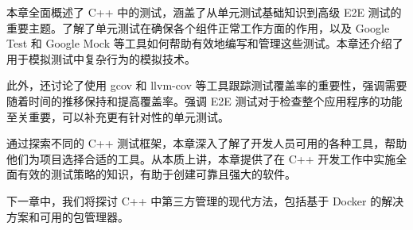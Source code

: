 
本章全面概述了 C++ 中的测试，涵盖了从单元测试基础知识到高级 E2E 测试的重要主题。了解了单元测试在确保各个组件正常工作方面的作用，以及 Google Test 和 Google Mock 等工具如何帮助有效地编写和管理这些测试。本章还介绍了用于模拟测试中复杂行为的模拟技术。

此外，还讨论了使用 gcov 和 llvm-cov 等工具跟踪测试覆盖率的重要性，强调需要随着时间的推移保持和提高覆盖率。强调 E2E 测试对于检查整个应用程序的功能至关重要，可以补充更有针对性的单元测试。

通过探索不同的 C++ 测试框架，本章深入了解了开发人员可用的各种工具，帮助他们为项目选择合适的工具。从本质上讲，本章提供了在 C++ 开发工作中实施全面有效的测试策略的知识，有助于创建可靠且强大的软件。

下一章中，我们将探讨 C++ 中第三方管理的现代方法，包括基于 Docker 的解决方案和可用的包管理器。
